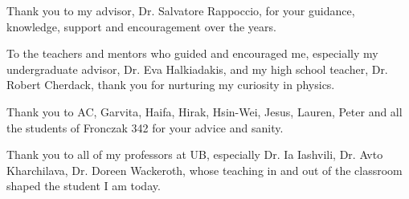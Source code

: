 
Thank you to my advisor, Dr. Salvatore Rappoccio, for your guidance, knowledge, support and encouragement over the years.

To the teachers and mentors who guided and encouraged me, especially my undergraduate advisor, Dr. Eva Halkiadakis, and my high school teacher, Dr. Robert Cherdack, thank you for nurturing my curiosity in physics.

Thank you to AC, Garvita, Haifa, Hirak, Hsin-Wei, Jesus, Lauren, Peter and all the students of Fronczak 342 for your advice and sanity.

Thank you to all of my professors at UB, especially Dr. Ia Iashvili, Dr. Avto Kharchilava, Dr. Doreen Wackeroth, whose teaching in and out of the classroom shaped the student I am today.

